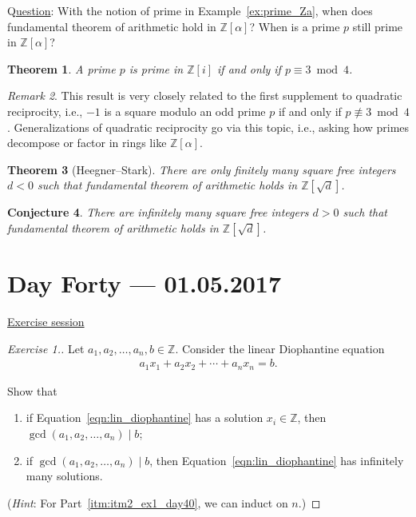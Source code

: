 \documentclass{amsbook}
\theoremstyle{plain}
\newtheorem{theorem}{Theorem}[chapter] %
\newtheorem{conjecture}[theorem]{Conjecture}
\theoremstyle{definition}
\theoremstyle{remark}
\newtheorem{remark}[theorem]{Remark}
\numberwithin{equation}{chapter}
\numberwithin{figure}{chapter}
\newcommand{\Z}{\mathbb{Z}}
\begin{document}
Q\underline{uestion}: With the notion of prime in Example~\ref{ex:prime_Za}, when does fundamental theorem of arithmetic hold in $\Z [\alpha]$? When is a prime $p$ still prime in $\Z [\alpha]$?
\begin{theorem}
  A prime $p$ is prime in $\Z [i]$ if and only if $p \equiv 3 \bmod 4$.
\end{theorem}
\begin{remark}
  This result is very closely related to the first supplement to quadratic reciprocity, i.e., $-1$ is a square modulo an odd prime $p$ if and only if $p \not\equiv 3 \bmod 4$. Generalizations of quadratic reciprocity go via this topic, i.e., asking how primes decompose or factor in rings like $\Z [\alpha]$.
\end{remark}
\begin{theorem}[Heegner--Stark]
  There are only finitely many square free integers $d < 0$ such that fundamental theorem of arithmetic holds in $\Z [\sqrt d]$.
\end{theorem}
\begin{conjecture}
  There are infinitely many square free integers $d > 0$ such that fundamental theorem of arithmetic holds in $\Z [\sqrt d]$.
\end{conjecture}

\chapter[Lecture Forty]{Day Forty \hfill {\footnotesize \rm --- 01.05.2017}}

\underline{Exercise session}
\begin{proof}[Exercise 1.]\renewcommand*{\qedsymbol}{}
  Let $a_1, a_2, \ldots, a_n, b \in \Z$. Consider the linear Diophantine equation
  \begin{align}
    a_1 x_1 + a_2 x_2 + \cdots + a_n x_n = b. \label{eqn:lin_diophantine}
  \end{align}

  Show that
  \begin{enumerate}[label=(\arabic*)]
  \item if Equation~\eqref{eqn:lin_diophantine} has a solution $x_i \in \Z$, then $\gcd (a_1, a_2, \ldots, a_n) \mid b$;
  \item if $\gcd (a_1, a_2, \ldots, a_n) \mid b$, then Equation~\eqref{eqn:lin_diophantine} has infinitely many solutions. \label{itm:itm2_ex1_day40}
  \end{enumerate}

  (\emph{Hint}: For Part~\ref{itm:itm2_ex1_day40}, we can induct on $n$.)
\end{proof}
\end{document}
